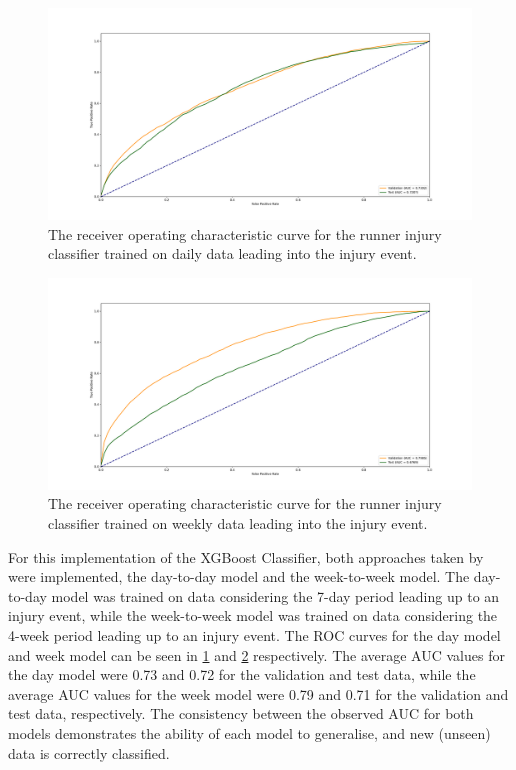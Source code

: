 \begin{figure}[ht]
  \centering
  \includegraphics[width=\textwidth]{figures/day_ROC.pdf}
  \captionsetup{justification=centering,width=0.8\textwidth}
  \caption[Runner Injury Day Model ROC Curve]{\label{fig:day_roc}The receiver operating characteristic curve for the runner injury classifier trained on daily data leading into the injury event.}
\end{figure}
\begin{figure}[ht]
  \centering
  \includegraphics[width=\textwidth]{figures/week_ROC.pdf}
  \captionsetup{justification=centering,width=0.8\textwidth}
  \caption[Runner Injury Day Model ROC Curve]{\label{fig:week_roc}The receiver operating characteristic curve for the runner injury classifier trained on weekly data leading into the injury event.}
\end{figure}

For this implementation of the XGBoost Classifier, both approaches taken by \textcite{Lovdal2021} were implemented, the day-to-day model and the week-to-week model. The day-to-day model was trained on data considering the 7-day period leading up to an injury event, while the week-to-week model was trained on data considering the 4-week period leading up to an injury event. The ROC curves for the day model and week model can be seen in \ref{fig:day_roc} and \ref{fig:week_roc} respectively. The average AUC values for the day model were 0.73 and 0.72 for the validation and test data, while the average AUC values for the week model were 0.79 and 0.71 for the validation and test data, respectively. The consistency between the observed AUC for both models demonstrates the ability of each model to generalise, and new (unseen) data is correctly classified.

